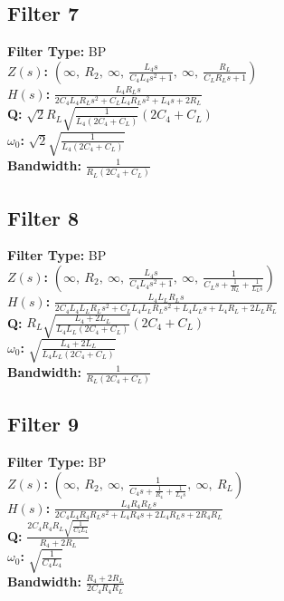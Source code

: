 \documentclass{article}
\begin{document}
\subsection*{Filter 7}
\textbf{Filter Type:} BP \\ 
\textbf{$Z(s)$:} $\left( \infty, \  R_{2}, \  \infty, \  \frac{L_{4} s}{C_{4} L_{4} s^{2} + 1}, \  \infty, \  \frac{R_{L}}{C_{L} R_{L} s + 1}\right)$ \\ 
\textbf{$H(s)$:} $\frac{L_{4} R_{L} s}{2 C_{4} L_{4} R_{L} s^{2} + C_{L} L_{4} R_{L} s^{2} + L_{4} s + 2 R_{L}}$ \\ 
\textbf{Q:} $\sqrt{2} R_{L} \sqrt{\frac{1}{L_{4} \left(2 C_{4} + C_{L}\right)}} \left(2 C_{4} + C_{L}\right)$ \\ 
\textbf{$\omega_0$:} $\sqrt{2} \sqrt{\frac{1}{L_{4} \left(2 C_{4} + C_{L}\right)}}$ \\ 
\textbf{Bandwidth:} $\frac{1}{R_{L} \left(2 C_{4} + C_{L}\right)}$ \\ 
\subsection*{Filter 8}
\textbf{Filter Type:} BP \\ 
\textbf{$Z(s)$:} $\left( \infty, \  R_{2}, \  \infty, \  \frac{L_{4} s}{C_{4} L_{4} s^{2} + 1}, \  \infty, \  \frac{1}{C_{L} s + \frac{1}{R_{L}} + \frac{1}{L_{L} s}}\right)$ \\ 
\textbf{$H(s)$:} $\frac{L_{4} L_{L} R_{L} s}{2 C_{4} L_{4} L_{L} R_{L} s^{2} + C_{L} L_{4} L_{L} R_{L} s^{2} + L_{4} L_{L} s + L_{4} R_{L} + 2 L_{L} R_{L}}$ \\ 
\textbf{Q:} $R_{L} \sqrt{\frac{L_{4} + 2 L_{L}}{L_{4} L_{L} \left(2 C_{4} + C_{L}\right)}} \left(2 C_{4} + C_{L}\right)$ \\ 
\textbf{$\omega_0$:} $\sqrt{\frac{L_{4} + 2 L_{L}}{L_{4} L_{L} \left(2 C_{4} + C_{L}\right)}}$ \\ 
\textbf{Bandwidth:} $\frac{1}{R_{L} \left(2 C_{4} + C_{L}\right)}$ \\ 
\subsection*{Filter 9}
\textbf{Filter Type:} BP \\ 
\textbf{$Z(s)$:} $\left( \infty, \  R_{2}, \  \infty, \  \frac{1}{C_{4} s + \frac{1}{R_{4}} + \frac{1}{L_{4} s}}, \  \infty, \  R_{L}\right)$ \\ 
\textbf{$H(s)$:} $\frac{L_{4} R_{4} R_{L} s}{2 C_{4} L_{4} R_{4} R_{L} s^{2} + L_{4} R_{4} s + 2 L_{4} R_{L} s + 2 R_{4} R_{L}}$ \\ 
\textbf{Q:} $\frac{2 C_{4} R_{4} R_{L} \sqrt{\frac{1}{C_{4} L_{4}}}}{R_{4} + 2 R_{L}}$ \\ 
\textbf{$\omega_0$:} $\sqrt{\frac{1}{C_{4} L_{4}}}$ \\ 
\textbf{Bandwidth:} $\frac{R_{4} + 2 R_{L}}{2 C_{4} R_{4} R_{L}}$ \\ 
\end{document}
